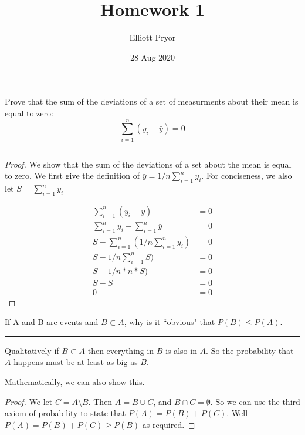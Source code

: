 \documentclass[11pt]{article}
\title{Homework 1}
\author{Elliott Pryor}
\date{28 Aug 2020}
\begin{document}
\maketitle

Prove that the sum of the deviations of a set of measurments about their mean is equal to zero:
$$\sum_{i=1}^n (y_i - \bar{y}) = 0$$
\hrule

\begin{proof}
We show that the sum of the deviations of a set about the mean is equal to zero. We first give the definition of $\bar{y} = 1/n \sum_{i=1}^n y_i$. For conciseness, we also let $S = \sum_{i=1}^n y_i$

\begin{align*}

\sum_{i=1}^n (y_i - \bar{y}) &= 0\\
\sum_{i=1}^n y_i - \sum_{i=1}^n \bar{y} &= 0\\
S - \sum_{i=1}^n (1/n \sum_{i=1}^n y_i) &= 0\\
S - 1/n \sum_{i=1}^n S) &= 0\\
S - 1/n * n * S) &= 0\\
S - S &= 0\\
0 &= 0
\end{align*}

\end{proof}




If A and B are events and $B \subset A$, why is it ``obvious" that $P(B) \leq P(A)$.
\hrule

Qualitatively if $B \subset A$ then everything in $B$ is also in $A$. So the probability that $A$ happens must be at least as big as $B$. 

Mathematically, we can also show this.
\begin{proof}
 We let $C = A \setminus B$. Then $A = B \cup C$, and $B \cap C = \emptyset$. So we can use the third axiom of probability to state that $P(A) = P(B) + P(C)$. Well $P(A) = P(B) + P(C) \geq P(B)$ as required.
\end{proof}
 
 
 
\end{document}
